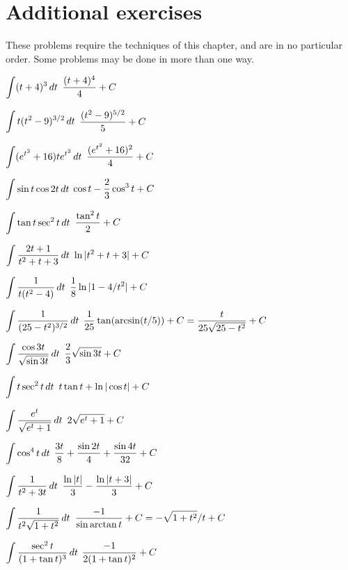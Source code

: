 \section{Additional exercises}{}{}
\nobreak
These problems require the techniques of this chapter, and are in no
particular order. Some problems may be done in more than one way.

\nobreak
\exercises*

\twocol

\exercise $\displaystyle\int (t+4)^3\,dt$
\answer $\displaystyle{(t+4)^4\over4}+C$
\endanswer
\endexercise

\exercise $\displaystyle\int t(t^2-9)^{3/2}\,dt$
\answer $\displaystyle{(t^2-9)^{5/2}\over5}+C$
\endanswer
\endexercise

\exercise $\displaystyle\int (e^{t^2}+16)te^{t^2}\,dt$
\answer $\displaystyle{(e^{t^2}+16)^2\over 4}+C$
\endanswer
\endexercise

\exercise $\displaystyle\int \sin t\cos 2t\,dt$
\answer $\displaystyle\cos t-{2\over3}\cos^3 t+C$
\endanswer
\endexercise

\exercise $\displaystyle\int \tan t\sec^2t\,dt$
\answer $\displaystyle{\tan^2 t\over 2}+C$
\endanswer
\endexercise

\exercise $\displaystyle\int {2t+1\over t^2+t+3}\,dt$
\answer $\displaystyle\ln|t^2+t+3|+C$
\endanswer
\endexercise

\exercise $\displaystyle\int {1\over t(t^2-4)}\,dt$
\answer $\displaystyle {1\over8} \ln|1-4/t^2|+C$
\endanswer
\endexercise

\exercise $\displaystyle\int {1\over (25-t^2)^{3/2}}\,dt$
\answer $\displaystyle{1\over25}\tan(\arcsin(t/5))+C={t\over25\sqrt{25-t^2}}+C$
\endanswer
\endexercise

\exercise $\displaystyle\int {\cos 3t\over\sqrt{\sin3t}}\,dt$
\answer $\displaystyle{2\over3}\sqrt{\sin 3t}+C$
\endanswer
\endexercise

\exercise $\displaystyle\int t\sec^2 t\,dt$
\answer $\displaystyle t\tan t+\ln|\cos t|+C$
\endanswer
\endexercise

\exercise $\displaystyle\int {e^t\over \sqrt{e^t+1}}\,dt$
\answer $\displaystyle 2\sqrt{e^t+1}+C$
\endanswer
\endexercise

\exercise $\displaystyle\int \cos^4 t\,dt$
\answer $\displaystyle{3t\over 8}+{\sin 2t\over4}+ {\sin 4t\over 32}+C$
\endanswer
\endexercise

\exercise $\displaystyle\int {1\over t^2+3t}\,dt$
\answer $\displaystyle{\ln |t|\over 3} - {\ln |t+3|\over 3}+C$
\endanswer
\endexercise

\exercise $\displaystyle\int {1\over t^2\sqrt{1+t^2}}\,dt$
\answer $\displaystyle{-1\over \sin\arctan t}+C=-\sqrt{1+t^2}/t+C$
\endanswer
\endexercise

\exercise $\displaystyle\int {\sec^2t\over (1+\tan t)^3}\,dt$
\answer $\displaystyle{-1\over 2(1+\tan t)^2}+C$
\endanswer
\endexercise

